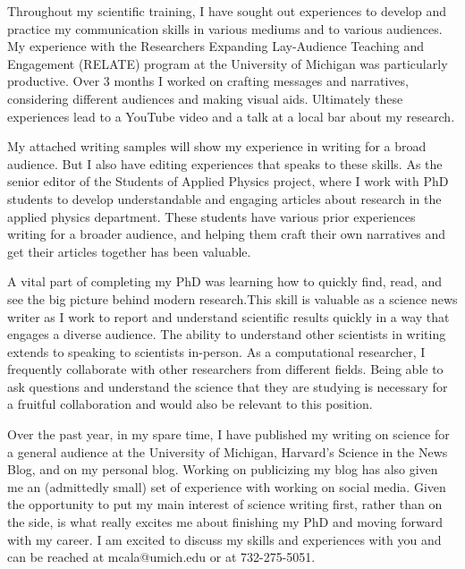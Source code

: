 \documentclass[10pt,letter,sans,final,colorlinks,linkcolor=blue]{moderncv}        %
\begin{document}
Throughout my scientific training, I have sought out experiences to develop and practice my communication skills in various mediums and to various audiences. My experience with the Researchers Expanding Lay-Audience Teaching and Engagement (RELATE) program at the University of Michigan was particularly productive. Over 3 months I worked on crafting messages and narratives, considering different audiences and making visual aids. Ultimately these experiences lead to a YouTube video and a talk at a local bar about my research.

My attached writing samples will show my experience in writing for a broad audience. But I also have editing experiences that speaks to these skills. As the senior editor of the Students of Applied Physics project, where I work with PhD students to develop understandable and engaging articles about research in the applied physics department. These students have various prior experiences writing for a broader audience, and helping them craft their own narratives and get their articles together has been valuable.

A vital part of completing my PhD was learning how to quickly find, read, and see the big picture behind modern research.This skill is valuable as a science news writer as I work to report and understand scientific results quickly in a way that engages a diverse audience. The ability to understand other scientists in writing extends to speaking to scientists in-person. As a computational researcher, I frequently collaborate with other researchers from different fields. Being able to ask questions and understand the science that they are studying is necessary for a fruitful collaboration and would also be relevant to this position.

Over the past year, in my spare time, I have published my writing on science for a general audience at the University of Michigan, Harvard’s Science in the News Blog, and on my personal blog. Working on publicizing my blog has also given me an (admittedly small) set of experience with working on social media. Given the opportunity to put my main interest of science writing first, rather than on the side, is what really excites me about finishing my PhD and moving forward with my career. I am excited to discuss my skills and experiences with you and can be reached at mcala@umich.edu or at 732-275-5051.

\makeletterclosing

\end{document}
